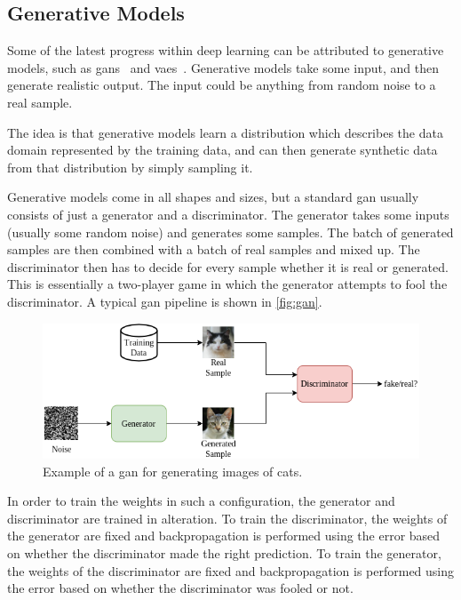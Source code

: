 \subsection{Generative Models}
Some of the latest progress within deep learning can be attributed to generative models, such as \glspl*{gan}~\cite{gan} and \glspl*{vae}~\cite{vae}. Generative models take some input, and then generate realistic output. The input could be anything from random noise to a real sample.
\par
The idea is that generative models learn a distribution which describes the data domain represented by the training data, and can then generate synthetic data from that distribution by simply sampling it.
\par
Generative models come in all shapes and sizes, but a standard \gls*{gan} usually consists of just a generator and a discriminator. The generator takes some inputs (usually some random noise) and generates some samples. The batch of generated samples are then combined with a batch of real samples and mixed up. The discriminator then has to decide for every sample whether it is real or generated. This is essentially a two-player game in which the generator attempts to fool the discriminator. A typical \gls*{gan} pipeline is shown in \autoref{fig:gan}.
\begin{figure}[htb]
    \centering
    \includegraphics[width=\linewidth]{resources/related_works/gan.png}
    \caption[Gan Example]{Example of a \gls*{gan} for generating images of cats.}
    \label{fig:gan}
\end{figure}
\par
In order to train the weights in such a configuration, the generator and discriminator are trained in alteration. To train the discriminator, the weights of the generator are fixed and backpropagation is performed using the error based on whether the discriminator made the right prediction. To train the generator, the weights of the discriminator are fixed and backpropagation is performed using the error based on whether the discriminator was fooled or not.
